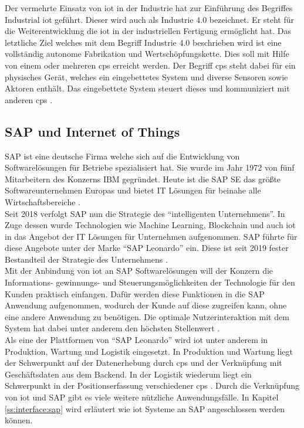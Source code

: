 \noindent Der vermehrte Einsatz von \ac{iot} in der Industrie hat zur Einführung des Begriffes Industrial \ac{iot} geführt. Dieser wird auch als Industrie 4.0 bezeichnet. Er steht für die Weiterentwicklung die \ac{iot} in der industriellen Fertigung ermöglicht hat. Das letztliche Ziel welches mit dem Begriff Industrie 4.0 beschrieben wird ist eine vollständig autonome Fabrikation und Wertschöpfungskette. Dies soll mit Hilfe von einem oder mehreren \ac{cps} erreicht werden. Der Begriff \ac{cps} steht dabei für ein physisches Gerät, welches ein eingebettetes System und diverse Sensoren sowie Aktoren enthält. Das eingebettete System steuert dieses und kommuniziert mit anderen \ac{cps} \cite[Seite 30f]{Schell17:INS}.\\

\subsection{SAP und Internet of Things}
\label{ss:grundlagen:sap}

\noindent SAP ist eine deutsche Firma welche sich auf die Entwicklung von Softwarelösungen für Betriebe spezialisiert hat. Sie wurde im Jahr 1972 von fünf Mitarbeitern des Konzerns IBM gegründet. Heute ist die SAP SE das größte Softwareunternehmen Europas und bietet IT Lösungen für beinahe alle Wirtschaftsbereiche \cite{SAP20:WWW}.\\

\noindent Seit 2018 verfolgt SAP nun die Strategie des "`intelligenten Unternehmens"'. In Zuge dessen wurde Technologien wie Machine Learning, Blockchain und auch \ac{iot} in das Angebot der IT Lösungen für Unternehmen aufgenommen. SAP führte für diese Angebote unter der Marke "`SAP Leonardo"' ein. Diese ist seit 2019 fester Bestandteil der Strategie des Unternehmens \cite[Seite 102f]{Holtschulte20:IOS}.\\ 

\noindent Mit der Anbindung von \ac{iot} an SAP Softwarelösungen will der Konzern die Informations- gewinnungs- und Steuerungsmöglichkeiten der Technologie für den Kunden praktisch einfangen. Dafür werden diese Funktionen in die SAP Anwendung aufgenommen, wodurch der Kunde auf diese zugreifen kann, ohne eine andere Anwendung zu benötigen. Die optimale Nutzerinteraktion mit dem System hat dabei unter anderem den höchsten Stellenwert \cite[Seite 105f]{Holtschulte20:IOS}.\\

\noindent Als eine der Plattformen von "`SAP Leonardo"' wird \ac{iot} unter anderem in Produktion, Wartung und Logistik eingesetzt. In Produktion und Wartung liegt der Schwerpunkt auf der Datenerhebung durch \ac{cps} und der Verknüpfung mit Geschäftsdaten aus dem Backend. In der Logistik wiederum liegt ein Schwerpunkt in der Positionserfassung verschiedener \ac{cps} \cite[Seite 107ff]{Holtschulte20:IOS}. Durch die Verknüpfung von \ac{iot} und SAP gibt es viele weitere nützliche Anwendungsfälle. In Kapitel \ref{ss:interface:sap} wird erläutert wie \ac{iot} Systeme an SAP angeschlossen werden können.\\

